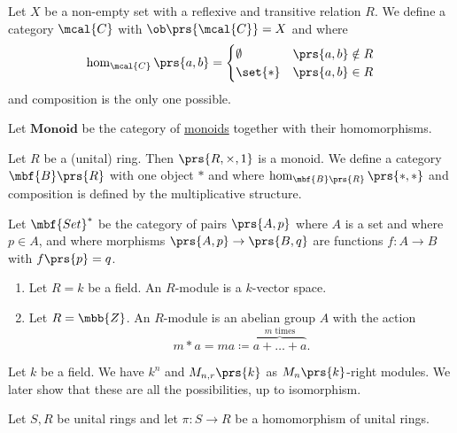 \documentclass[11pt]{kbook}
\begin{document}
\begin{example}
Let $X$ be a non-empty set with a reflexive and transitive relation $R$. We define a category $\mcal{C}$ with $\ob\prs{\mcal{C}} = X$ and where
\[\hom_{\mcal{C}}\prs{a,b} = \begin{cases}\emptyset & \prs{a,b} \notin R \\ \set{*} & \prs{a,b} \in R\end{cases}\]
and composition is the only one possible.
\end{example}

\begin{example}
Let $\mathbf{Monoid}$ be the category of \href{https://en.wikipedia.org/wiki/Monoid}{monoids} together with their homomorphisms.
\end{example}

\begin{example}
Let $R$ be a (unital) ring. Then $\prs{R, \times, 1}$ is a monoid. We define a category $\mbf{B}\prs{R}$ with one object $*$ and where $\hom_{\mbf{B}\prs{R}}\prs{*, *}$ and composition is defined by the multiplicative structure.
\end{example}

\begin{example}
Let $\mbf{Set}^*$ be the category of pairs $\prs{A,p}$ where $A$ is a set and where $p \in A$, and where morphisms $\prs{A,p} \to \prs{B,q}$ are functions $f \colon A \to B$ with $f\prs{p} = q$.
\end{example}

\begin{example}
\begin{enumerate}
\item Let $R = k$ be a field. An $R$-module is a $k$-vector space.

\item Let $R = \mbb{Z}$. An $R$-module is an abelian group $A$ with the action
\[ m * a = ma \coloneqq \overset{\text{$m$ times}}{\overbrace{a + \ldots + a}} \text{.} \]
\end{enumerate}
\end{example}

\begin{example}
Let $k$ be a field. We have $k^n$ and $M_{n, r}\prs{k}$ as $M_n\prs{k}$-right modules. We later show that these are all the possibilities, up to isomorphism.
\end{example}

\begin{example}
Let $S,R$ be unital rings and let $\pi \colon S \to R$ be a homomorphism of unital rings. 
\end{example}




\printbibliography
\end{document}

